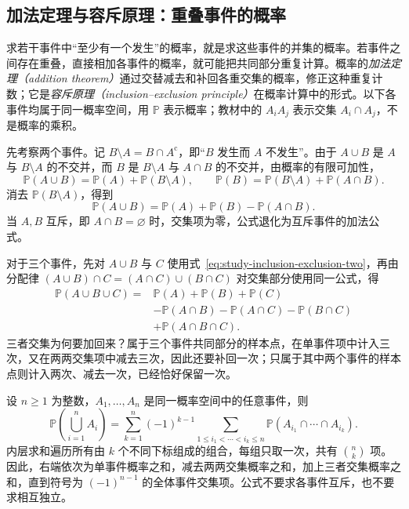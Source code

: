 \documentclass[UTF8,12pt,a4paper,fontset=fandol]{ctexbook}
\begin{document}
\subsection{加法定理与容斥原理：重叠事件的概率}
\label{subsec:study-inclusion-exclusion}

求若干事件中“至少有一个发生”的概率，就是求这些事件的并集的概率。若事件之间存在重叠，直接相加各事件的概率，就可能把共同部分重复计算。概率的\emph{加法定理（addition theorem）}通过交替减去和补回各重交集的概率，修正这种重复计数；它是\emph{容斥原理（inclusion--exclusion principle）}在概率计算中的形式。以下各事件均属于同一概率空间，用 $\mathbb P$ 表示概率；教材中的 $A_iA_j$ 表示交集 $A_i\cap A_j$，不是概率的乘积。

先考察两个事件。记 $B\setminus A=B\cap A^{\mathrm c}$，即“$B$ 发生而 $A$ 不发生”。由于 $A\cup B$ 是 $A$ 与 $B\setminus A$ 的不交并，而 $B$ 是 $B\setminus A$ 与 $A\cap B$ 的不交并，由概率的有限可加性，
\[
  \mathbb P(A\cup B)=\mathbb P(A)+\mathbb P(B\setminus A),
  \qquad
  \mathbb P(B)=\mathbb P(B\setminus A)+\mathbb P(A\cap B).
\]
消去 $\mathbb P(B\setminus A)$，得到
\begin{equation}
  \mathbb P(A\cup B)
    =\mathbb P(A)+\mathbb P(B)-\mathbb P(A\cap B).
  \label{eq:study-inclusion-exclusion-two}
\end{equation}
当 $A,B$ 互斥，即 $A\cap B=\varnothing$ 时，交集项为零，公式退化为互斥事件的加法公式。

对于三个事件，先对 $A\cup B$ 与 $C$ 使用式~\eqref{eq:study-inclusion-exclusion-two}，再由分配律 $(A\cup B)\cap C=(A\cap C)\cup(B\cap C)$ 对交集部分使用同一公式，得
\begin{equation}
  \begin{aligned}
    \mathbb P(A\cup B\cup C)
      ={}&\mathbb P(A)+\mathbb P(B)+\mathbb P(C)\\
         &-\mathbb P(A\cap B)-\mathbb P(A\cap C)-\mathbb P(B\cap C)\\
         &+\mathbb P(A\cap B\cap C).
  \end{aligned}
  \label{eq:study-inclusion-exclusion-three}
\end{equation}
三者交集为何要加回来？属于三个事件共同部分的样本点，在单事件项中计入三次，又在两两交集项中减去三次，因此还要补回一次；只属于其中两个事件的样本点则计入两次、减去一次，已经恰好保留一次。

\begin{theorem}[有限个事件的加法定理]
\label{thm:study-inclusion-exclusion}
设 $n\ge1$ 为整数，$A_1,\ldots,A_n$ 是同一概率空间中的任意事件，则
\begin{equation}
  \mathbb P\!\left(\bigcup_{i=1}^{n}A_i\right)
    =\sum_{k=1}^{n}(-1)^{k-1}
      \sum_{1\le i_1<\cdots<i_k\le n}
      \mathbb P(A_{i_1}\cap\cdots\cap A_{i_k}).
  \label{eq:study-inclusion-exclusion-general}
\end{equation}
内层求和遍历所有由 $k$ 个不同下标组成的组合，每组只取一次，共有 $\binom nk$ 项。因此，右端依次为单事件概率之和，减去两两交集概率之和，加上三者交集概率之和，直到符号为 $(-1)^{n-1}$ 的全体事件交集项。公式不要求各事件互斥，也不要求相互独立。
\end{theorem}
\end{document}
